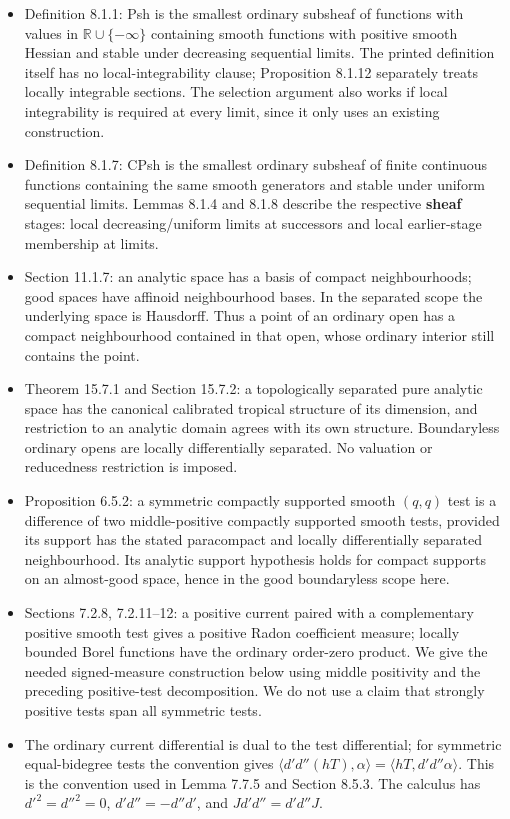 \documentclass[
  11pt,
]{article}
\providecommand{\tightlist}{%
  \setlength{\itemsep}{0pt}\setlength{\parskip}{0pt}}
\begin{document}
\begin{itemize}
\tightlist
\item
  Definition 8.1.1: Psh is the smallest ordinary subsheaf of functions
  with values in \(\mathbb R\cup\{-\infty\}\) containing smooth
  functions with positive smooth Hessian and stable under decreasing
  sequential limits. The printed definition itself has no
  local-integrability clause; Proposition 8.1.12 separately treats locally
  integrable sections. The selection argument also works if local
  integrability is required at every limit, since it only uses an
  existing construction.
\item
  Definition 8.1.7: CPsh is the smallest ordinary subsheaf of finite
  continuous functions containing the same smooth generators and stable
  under uniform sequential limits. Lemmas 8.1.4 and 8.1.8 describe the
  respective \textbf{sheaf} stages: local decreasing/uniform limits at
  successors and local earlier-stage membership at limits.
\item
  Section 11.1.7: an analytic space has a basis of compact
  neighbourhoods; good spaces have affinoid neighbourhood bases. In the
  separated scope the underlying space is Hausdorff. Thus a point of an
  ordinary open has a compact neighbourhood contained in that open,
  whose ordinary interior still contains the point.
\item
  Theorem 15.7.1 and Section 15.7.2: a topologically separated pure
  analytic space has the canonical calibrated tropical structure of its
  dimension, and restriction to an analytic domain agrees with its own
  structure. Boundaryless ordinary opens are locally differentially
  separated. No valuation or reducedness restriction is imposed.
\item
  Proposition 6.5.2: a symmetric compactly supported smooth \((q,q)\)
  test is a difference of two middle-positive compactly supported smooth
  tests, provided its support has the stated paracompact and locally
  differentially separated neighbourhood. Its analytic support
  hypothesis holds for compact supports on an almost-good space, hence
  in the good boundaryless scope here.
\item
  Sections 7.2.8, 7.2.11--12: a positive current paired with a
  complementary positive smooth test gives a positive Radon coefficient
  measure; locally bounded Borel functions have the ordinary order-zero
  product. We give the needed signed-measure construction below using
  middle positivity and the preceding positive-test decomposition. We do
  not use a claim that strongly positive tests span all symmetric tests.
\item
  The ordinary current differential is dual to the test differential;
  for symmetric equal-bidegree tests the convention gives
  \(\langle d'd''(hT),\alpha\rangle
  =\langle hT,d'd''\alpha\rangle\). This is the convention used in Lemma
  7.7.5 and Section 8.5.3. The calculus has \(d'^2=d''^2=0\),
  \(d'd''=-d''d'\), and \(Jd'd''=d'd''J\).
\end{itemize}
\end{document}
